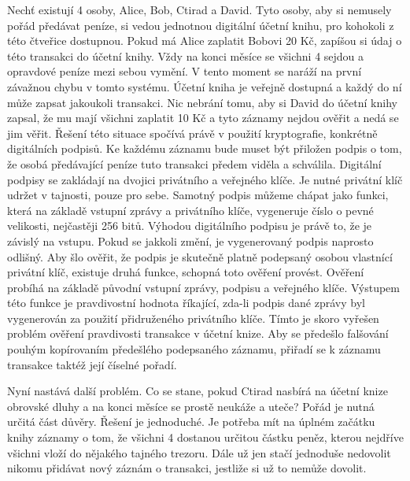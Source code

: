 Nechť existují 4 osoby, Alice, Bob, Ctirad a David. Tyto osoby, aby si nemusely pořád předávat peníze, si vedou jednotnou digitální účetní knihu,
pro kohokoli z této čtveřice dostupnou. Pokud má Alice zaplatit Bobovi 20 Kč, zapíšou si údaj o této transakci do účetní knihy. Vždy na
konci měsíce se všichni 4 sejdou a opravdové peníze mezi sebou vymění. V tento moment se naráží na první závažnou chybu v tomto systému.
Účetní kniha je veřejně dostupná a každý do ní může zapsat jakoukoli transakci. Nic nebrání tomu, aby si David do účetní knihy zapsal, že
mu mají všichni zaplatit 10 Kč a tyto záznamy nejdou ověřit a nedá se jim věřit. Řešení této situace spočívá právě v použití kryptografie,
konkrétně digitálních podpisů. Ke každému záznamu bude muset být přiložen podpis o tom, že osobá předávající peníze tuto transakci předem
viděla a schválila. Digitální podpisy se zakládají na dvojici privátního a veřejného klíče. Je nutné privátní klíč udržet v tajnosti,
pouze pro sebe. Samotný podpis můžeme chápat jako funkci, která na základě vstupní zprávy a privátního klíče, vygeneruje číslo o pevné velikosti,
nejčastěji 256 bitů. Výhodou digitálního podpisu je právě to, že je závislý na vstupu. Pokud se jakkoli změní, je vygenerovaný podpis
naprosto odlišný. Aby šlo ověřit, že podpis je skutečně platně podepsaný osobou vlastnící privátní klíč, existuje druhá funkce, schopná
toto ověření provést. Ověření probíhá na základě původní vstupní zprávy, podpisu a veřejného klíče. Výstupem této funkce je pravdivostní
hodnota říkající, zda-li podpis dané zprávy byl vygenerován za použití přidruženého privátního klíče. Tímto je skoro vyřešen problém ověření
pravdivosti transakce v účetní knize. Aby se předešlo falšování pouhým kopírovaním předešlého podepsaného záznamu, přiřadí se k záznamu
transakce taktéž její číselné pořadí.

Nyní nastává další problém. Co se stane, pokud Ctirad nasbírá na účetní knize obrovské dluhy a na konci měsíce se prostě neukáže a uteče?
Pořád je nutná určitá část důvěry. Řešení je jednoduché. Je potřeba mít na úplném začátku knihy záznamy o tom, že všichni 4 dostanou
určitou částku peněz, kterou nejdříve všichni vloží do nějakého tajného trezoru. Dále už jen stačí jednoduše nedovolit nikomu přidávat
nový záznám o transakci, jestliže si už to nemůže dovolit.

